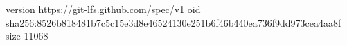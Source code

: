 version https://git-lfs.github.com/spec/v1
oid sha256:8526b818481b7c5c15e3d8e46524130e251b6f46b440ea736f9dd973cea4aa8f
size 11068

